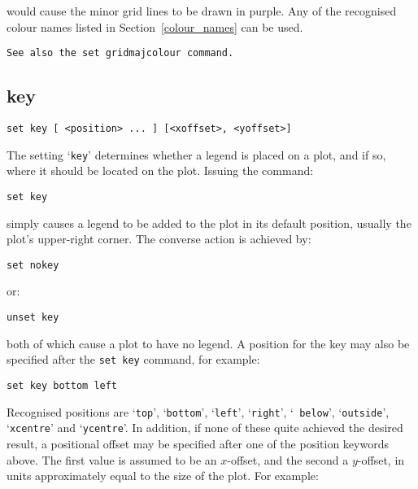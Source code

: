 \documentclass[a4paper,onecolumn,11pt]{book}
\begin{document}
\noindent would cause the minor grid lines to be drawn in purple. Any of the recognised
colour names listed in Section~\ref{colour_names} can be used.

\begin{verbatim}
See also the set gridmajcolour command.
\end{verbatim}


\subsection{key}

\begin{verbatim}
set key [ <position> ... ] [<xoffset>, <yoffset>]
\end{verbatim}

The setting `{\tt key}' determines whether a legend is placed on a plot, and if
so, where it should be located on the plot. Issuing the command:

\begin{verbatim}
set key
\end{verbatim}

\noindent simply causes a legend to be added to the plot in its default position, usually
the plot's upper-right corner. The converse action is achieved by:

\begin{verbatim}
set nokey
\end{verbatim}

\noindent or:

\begin{verbatim}
unset key
\end{verbatim}

\noindent both of which cause a plot to have no legend. A position for the key may also
be specified after the {\tt set key} command, for example:

\begin{verbatim}
set key bottom left
\end{verbatim}

Recognised positions are `{\tt top}', `{\tt bottom}', `{\tt left}', `{\tt right}', `{\tt
below}', `{\tt outside}', `{\tt xcentre}' and `{\tt ycentre}'. In addition, if none of
these quite achieved the desired result, a positional offset may be specified
after one of the position keywords above.  The first value is assumed to be an
$x$-offset, and the second a $y$-offset, in units approximately equal to the
size of the plot. For example:
\end{document}
